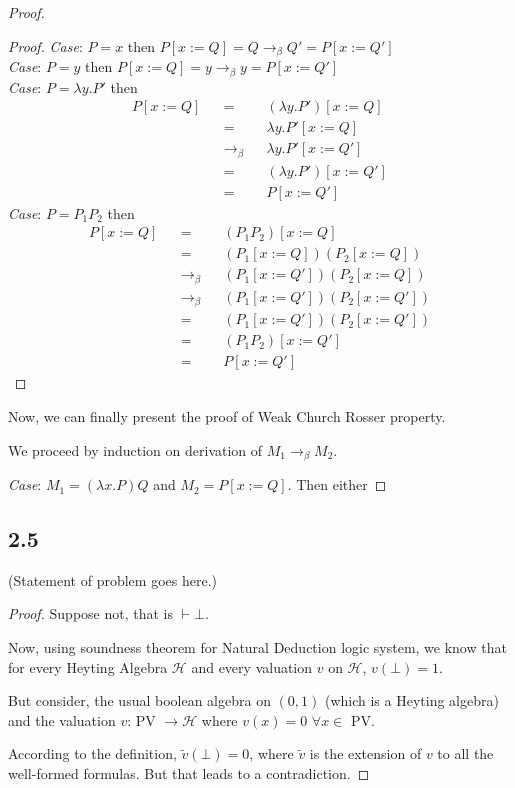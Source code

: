 \documentclass[12pt]{article}
\begin{document}
\begin{proof}
\begin{proof}
\textsl{Case}: $P=x$ then $P[x:=Q] = Q \rightarrow_{\beta} Q' = P[x:=Q']$ \\
\textsl{Case}: $P=y$ then $P[x:=Q] = y \rightarrow_{\beta} y = P[x:=Q']$ \\
\textsl{Case}: $P=\lambda y.P'$ then
\begin{align*}
    P[x:=Q] &&=&& (\lambda y.P')[x:=Q] \\
    &&=&& \lambda y.P'[x:=Q] \\
    &&\rightarrow_{\beta}&&  \lambda y.P'[x:=Q'] \\
    &&=&& (\lambda y.P')[x:=Q'] \\
    &&=&& P[x:=Q']
\end{align*}
\textsl{Case}: $P = P_1 P_2$ then
\begin{align*}
    P[x:=Q] &&=&& (P_1 P_2)[x:=Q] \\
    &&=&&  (P_1[x:=Q])(P_2[x:=Q]) \\
    &&\rightarrow_{\beta}&& (P_1[x:=Q'])(P_2[x:=Q]) \\
    &&\rightarrow_{\beta}&& (P_1[x:=Q'])(P_2[x:=Q']) \\
    &&=&&  (P_1[x:=Q'])(P_2[x:=Q']) \\
    &&=&& (P_1 P_2)[x:=Q'] \\
    &&=&& P[x:=Q']
\end{align*}
\end{proof}

Now, we can finally present the proof of Weak Church Rosser property.

We proceed by induction on derivation of $M_1 \rightarrow_{\beta} M_2$.

\textsl{Case}: $M_1 = (\lambda x. P) Q$ and $M_2 = P[x:=Q]$. Then either 



\end{proof}


\subsection*{2.5}
(Statement of problem goes here.)\\

\begin{proof}
Suppose not, that is $\vdash \bot$.

Now, using soundness theorem for Natural Deduction logic system, we know that for every Heyting Algebra $\mathcal{H}$ and every valuation $v$ on $\mathcal{H}$, $v(\bot) = 1$.

But consider, the usual boolean algebra on $(0,1)$ (which is a Heyting algebra) and the valuation $v$: PV $\rightarrow \mathcal{H}$ where $v(x) = 0$ $\forall x \in$ PV.

According to the definition, $\widetilde{v}(\bot) = 0$, where $\widetilde{v}$ is the extension of $v$ to all the well-formed formulas. But that leads to a contradiction.
\end{proof}
\end{document}
